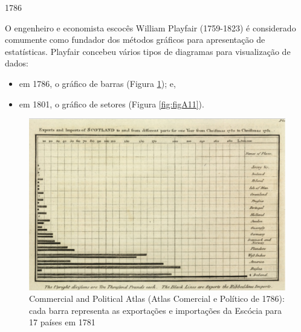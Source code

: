 \documentclass[
]{book}
\providecommand{\tightlist}{%
  \setlength{\itemsep}{0pt}\setlength{\parskip}{0pt}}
\begin{document}
\hfill\break

1786

\hfill\break

O engenheiro e economista escocês William Playfair (1759-1823) é considerado comumente como fundador dos métodos gráficos para apresentação de estatísticas. Playfair concebeu vários tipos de diagramas para visualização de dados:

\begin{itemize}
\tightlist
\item
  em 1786, o gráfico de barras (Figura \ref{fig:figA10}); e,
\item
  em 1801, o gráfico de setores (Figura \ref{fig:figA11}).
\end{itemize}

\hfill\break

\begin{figure}

{\centering \includegraphics[width=0.75\linewidth]{images1/playfair-barchart-1786} 

}

\caption{Commercial and Political Atlas (Atlas Comercial e Político de 1786): cada barra representa as exportações e importações da Escócia para 17 países em 1781}\label{fig:figA10}
\end{figure}

\hfill\break
\end{document}
